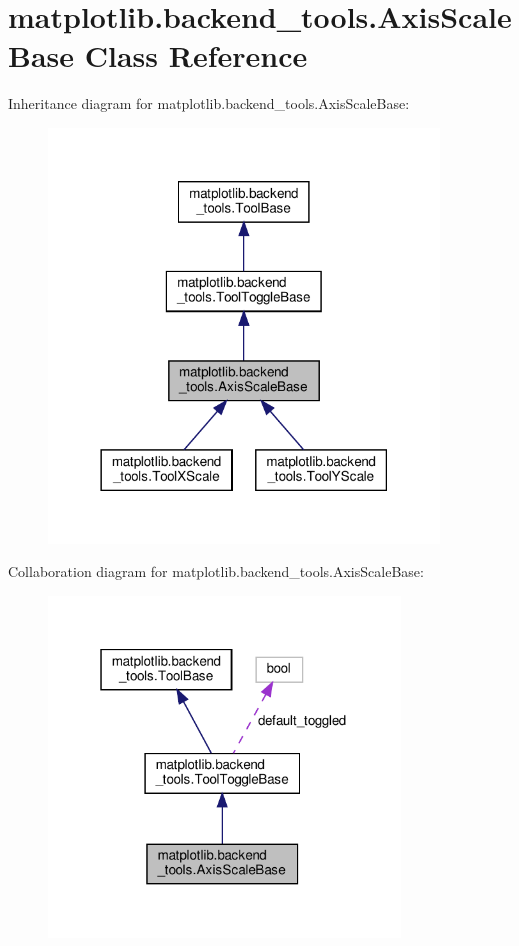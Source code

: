 \hypertarget{classmatplotlib_1_1backend__tools_1_1AxisScaleBase}{}\section{matplotlib.\+backend\+\_\+tools.\+Axis\+Scale\+Base Class Reference}
\label{classmatplotlib_1_1backend__tools_1_1AxisScaleBase}


Inheritance diagram for matplotlib.\+backend\+\_\+tools.\+Axis\+Scale\+Base\+:
\nopagebreak
\begin{figure}[H]
\begin{center}
\leavevmode
\includegraphics[width=294pt]{classmatplotlib_1_1backend__tools_1_1AxisScaleBase__inherit__graph}
\end{center}
\end{figure}


Collaboration diagram for matplotlib.\+backend\+\_\+tools.\+Axis\+Scale\+Base\+:
\nopagebreak
\begin{figure}[H]
\begin{center}
\leavevmode
\includegraphics[width=265pt]{classmatplotlib_1_1backend__tools_1_1AxisScaleBase__coll__graph}
\end{center}
\end{figure}
